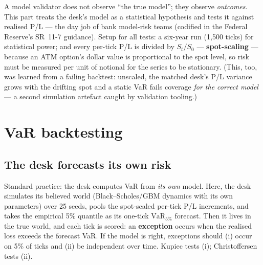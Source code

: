 \documentclass[11pt,a4paper]{article}
\begin{document}
A model validator does not observe ``the true model''; they observe
\emph{outcomes}. This part treats the desk's model as a statistical hypothesis
and tests it against realised P/L --- the day job of bank model-risk teams
(codified in the Federal Reserve's SR~11-7 guidance). Setup for all tests: a
six-year run (1{,}500 ticks) for statistical power; and every per-tick P/L is
divided by $S_t/S_0$ --- \textbf{spot-scaling} --- because an ATM option's
dollar value is proportional to the spot level, so risk must be measured per
unit of notional for the series to be stationary. (This, too, was learned from
a failing backtest: unscaled, the matched desk's P/L variance grows with the
drifting spot and a static VaR fails coverage \emph{for the correct model} ---
a second simulation artefact caught by validation tooling.)

\section{VaR backtesting}
\label{sec:varbacktest}

\subsection{The desk forecasts its own risk}
Standard practice: the desk computes VaR from \emph{its own} model. Here, the
desk simulates its believed world (Black--Scholes/GBM dynamics with its own
parameters) over 25 seeds, pools the spot-scaled per-tick P/L increments, and
takes the empirical 5\% quantile as its one-tick $\text{VaR}_{5\%}$ forecast.
Then it lives in the true world, and each tick is scored: an
\textbf{exception} occurs when the realised loss exceeds the forecast VaR.
If the model is right, exceptions should (i) occur on 5\% of ticks and (ii) be
independent over time. Kupiec tests (i); Christoffersen tests (ii).
\end{document}

